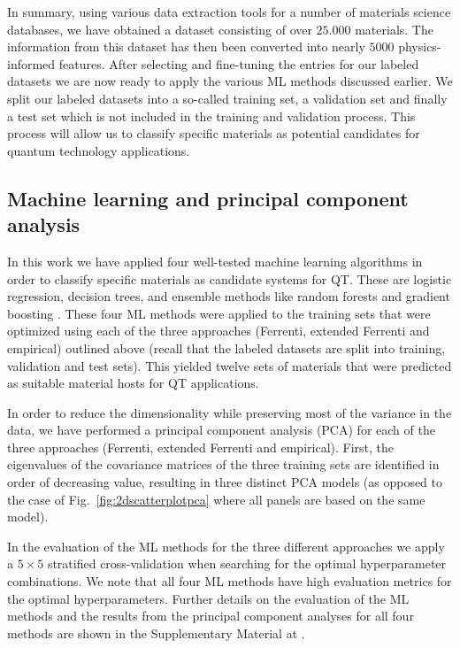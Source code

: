 \documentclass[superscriptaddress,unsortedaddress,
 amsmath,amssymb,
 aps,
]{revtex4-2}
\begin{document}
In summary, using various data extraction tools for a number of materials science databases, we have obtained a dataset consisting of over $25.000$ materials. The information from this dataset has then been converted into nearly $5000$ physics-informed features.  
After selecting and fine-tuning the entries for our labeled datasets we are now ready to apply the various ML methods discussed earlier. We split our labeled datasets into a so-called training set, a validation set and finally a test set which is not included in the training and validation process. This process will allow us to classify specific materials as potential candidates for quantum technology applications. 

\subsection*{Machine learning and principal component analysis}
In this work we have applied
four well-tested machine learning algorithms in order to classify specific materials as candidate systems for QT. These are logistic regression, decision trees, and ensemble methods like random forests and gradient boosting \cite{Mehta2019,Hastie2009,Murphy2012}. 
These four ML methods were applied to the training sets that were optimized using each of the three approaches (Ferrenti, extended Ferrenti and empirical) outlined above (recall that the labeled datasets are split into training, validation and test sets). This yielded twelve sets of materials that were predicted as suitable material hosts for QT applications.  

In order to reduce the dimensionality while preserving most of the variance in the data,
we have performed a principal component analysis (PCA) \cite{Jolliffe2002} for each of the three approaches (Ferrenti, extended Ferrenti and empirical).
First, the eigenvalues of the covariance matrices of the three training sets are identified in order of decreasing value,  resulting in three distinct PCA models (as opposed to the case of Fig.~\ref{fig:2dscatterplotpca} where all panels are based on the same model). 

 In the evaluation of the ML methods for the three different approaches we apply a $5\times 5$ stratified cross-validation \cite{Hastie2009} when searching for the optimal hyperparameter combinations. We note that all four ML methods have high evaluation metrics for the optimal hyperparameters. Further details on the evaluation of the ML methods and the results from the principal component analyses for all four methods are shown in the Supplementary Material at \cite{supplementary}. 
\end{document}
